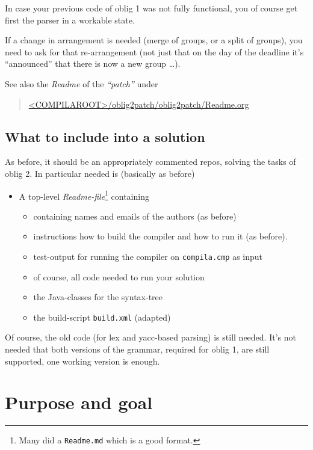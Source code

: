 \documentclass[11pt,freeform]{handout}[2014/08/13]
\begin{document}
In case your previous code of oblig 1 was not fully functional, you of
course get first the parser in a workable state.


If a change in arrangement is needed (merge of groups, or a split of
groups), you need to ask for that re-arrangement (not just that on the day
of the deadline it's ``announced'' that there is now a new group \ldots).



See also the \emph{Readme} of the \emph{``patch''} under

\begin{quote}
  \url{<COMPILAROOT>/oblig2patch/oblig2patch/Readme.org}
\end{quote}


\subsection{What to include into a solution}
\label{sec:what-include-into}

As before, it should be an appropriately commented repos, solving the tasks
of oblig 2. In particular needed is (basically as before)


\begin{itemize}
\item A top-level \emph{Readme-file}\footnote{Many did a \texttt{Readme.md}
    which is a good format.} containing
  \begin{itemize}
  \item containing names and emails of the authors (as before)
  \item instructions how to build the compiler and how to run it (as
    before).
  \item test-output for running the compiler on \texttt{compila.cmp} as
    input
  \item of course, all code needed to run your solution 
  \item the Java-classes for the syntax-tree
  \item the build-script \texttt{build.xml} (adapted)
  \end{itemize}
\end{itemize}

Of course, the old code (for lex and yacc-based parsing) is still
needed. It's not needed that both versions of the grammar, required for
oblig 1, are still supported, one working version is enough.



\section{Purpose and goal}
\label{sec:x}
\end{document}
